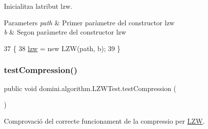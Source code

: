 Inicialitza l\textquotesingle{}atribut lzw. 


\begin{DoxyParams}{Parameters}
{\em path} & Primer paràmetre del constructor lzw \\
\hline
{\em b} & Segon paràmetre del constructor lzw \\
\hline
\end{DoxyParams}

\begin{DoxyCode}
37                                                     \{
38         \hyperlink{classdomini_1_1algorithm_1_1LZWTest_a591c1bb9b927631d0e60a2853e502d20}{lzw} = \textcolor{keyword}{new} LZW(path, b);
39     \}
\end{DoxyCode}
\mbox{\label{classdomini_1_1algorithm_1_1LZWTest_ae43f1a846dc9672b04c707314006a878}} 
\subsubsection{\texorpdfstring{test\+Compression()}{testCompression()}}
{\footnotesize\ttfamily public void domini.\+algorithm.\+L\+Z\+W\+Test.\+test\+Compression (\begin{DoxyParamCaption}{ }\end{DoxyParamCaption})\hspace{0.3cm}{\ttfamily [inline]}}



Comprovació del correcte funcionament de la compressio per \hyperlink{classdomini_1_1algorithm_1_1LZW}{L\+ZW}. 


